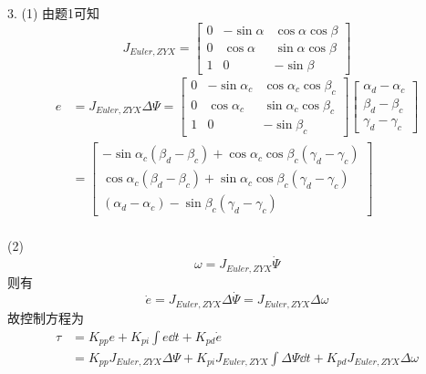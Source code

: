 \documentclass[UTF8, 12pt]{ctexart}
\begin{document}
\newpage


3.
(1)
由题1可知
\[
J_{Euler, ZYX} = \begin{bmatrix}
                    0 & -\sin\alpha & \cos\alpha \cos\beta \\
                    0 & \cos\alpha & \sin\alpha \cos\beta \\
                    1 & 0 & -\sin\beta
                \end{bmatrix}
\]
\[
\begin{aligned}
    e &= J_{Euler, ZYX} \Delta \Psi
    = \begin{bmatrix}
            0 & -\sin\alpha_c & \cos\alpha_c \cos\beta_c \\
            0 & \cos\alpha_c & \sin\alpha_c \cos\beta_c \\
            1 & 0 & -\sin\beta_c
        \end{bmatrix}
        \begin{bmatrix}
            \alpha_d - \alpha_c \\
            \beta_d - \beta_c \\
            \gamma_d - \gamma_c
        \end{bmatrix} \\
    &= \begin{bmatrix}
            -\sin\alpha_c (\beta_d - \beta_c) + \cos\alpha_c \cos\beta_c (\gamma_d - \gamma_c) \\
            \cos\alpha_c (\beta_d - \beta_c) + \sin\alpha_c \cos\beta_c (\gamma_d - \gamma_c) \\
            (\alpha_d - \alpha_c) - \sin\beta_c (\gamma_d - \gamma_c)
        \end{bmatrix} \\
\end{aligned}
\]
\vspace{5em}


(2)
\[
\omega = J_{Euler, ZYX} \dot{\Psi}
\]
则有
\[
\dot{e} = J_{Euler, ZYX} \Delta\dot{\Psi} = J_{Euler, ZYX} \Delta \omega
\]
故控制方程为
\[
\begin{aligned}
    \tau &= K_{pp}e + K_{pi}\int e \dd t + K_{pd}\dot{e} \\
        &= K_{pp} J_{Euler, ZYX} \Delta \Psi + K_{pi} J_{Euler, ZYX} \int \Delta \Psi \dd t + K_{pd} J_{Euler, ZYX} \Delta \omega
\end{aligned}
\]
\end{document}

